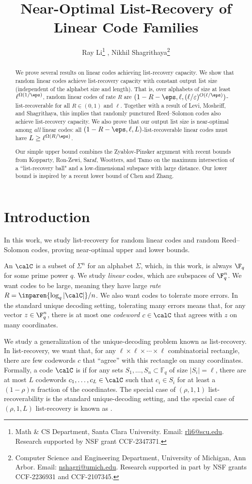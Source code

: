 \documentclass{article}
\title{Near-Optimal List-Recovery of Linear Code Families}
\author{Ray Li\thanks{Math \& CS Department, Santa Clara University. Email: \url{rli6@scu.edu}. Research supported by NSF grant CCF-2347371.} , Nikhil Shagrithaya\thanks{Computer Science and Engineering Department, University of Michigan, Ann Arbor. Email: \url{nshagri@umich.edu}. Research supported in part by NSF grants CCF-2236931 and CCF-2107345.}}
\date{}
\begin{document}
    

\maketitle

\begin{abstract}

We prove several results on linear codes achieving list-recovery capacity.
We show that random linear codes achieve list-recovery capacity with constant output list size (independent of the alphabet size and length).
That is, over alphabets of size at least $\ell^{\Omega(1/\eps)}$, random linear codes of rate $R$ are $(1-R-\eps, \ell, (\ell/\varepsilon)^{O(\ell/\eps)})$-list-recoverable for all $R\in(0,1)$ and $\ell$.
Together with a result of Levi, Mosheiff, and Shagrithaya, this implies that randomly punctured Reed--Solomon codes also achieve list-recovery capacity. 
We also prove that our output list size is near-optimal among \emph{all} linear codes: all $(1-R-\eps, \ell, L)$-list-recoverable linear codes must have $L\ge \ell^{\Omega(R/\eps)}$.

Our simple upper bound combines the Zyablov-Pinsker argument with recent bounds from Kopparty, Ron-Zewi, Saraf, Wootters, and Tamo on the maximum intersection of a ``list-recovery ball" and a low-dimensional subspace with large distance.
Our lower bound is inspired by a recent lower bound of Chen and Zhang.
\end{abstract}

\section{Introduction}
In this work, we study list-recovery for random linear codes and random Reed--Solomon codes, proving near-optimal upper and lower bounds. 

An  $\calC$ is a subset of $\Sigma^n$ for an alphabet $\Sigma$, which, in this work, is always $\F_q$ for some prime power $q$.
We study \emph{linear} codes, which are subspaces of $\F_q^n$. 
We want codes to be large, meaning they have large \emph{rate} $R=\inparen{\log_q |\calC|}/n$.
We also want codes to tolerate more errors.
In the standard unique decoding setting, tolerating many errors means that, for any vector $z\in\F_q^n$, there is at most one \emph{codeword} $c\in\calC$ that agrees with $z$ on many coordinates.

We study a generalization of the unique-decoding problem known as list-recovery.
In list-recovery, we want that, for any $\ell\times\ell\times\cdots\times \ell$ combinatorial rectangle, there are few codewords $c$ that ``agree'' with this rectangle on many coordinates.
Formally, a code $\calC$ is  if for any sets $S_1,\dots,S_n\subset \mathbb{F}_q$ of size $|S_i|=\ell$, there are at most $L$ codewords $c_1,\ldots, c_L \in \calC$ such that $c_i \in  S_i$ for at least a $(1-\rho) n$ fraction of the coordinates. The special case of $(\rho, 1,1)$ list-recoverability is the standard unique-decoding setting, and the special case of $(\rho, 1, L)$ list-recovery is known as . 
\end{document}
